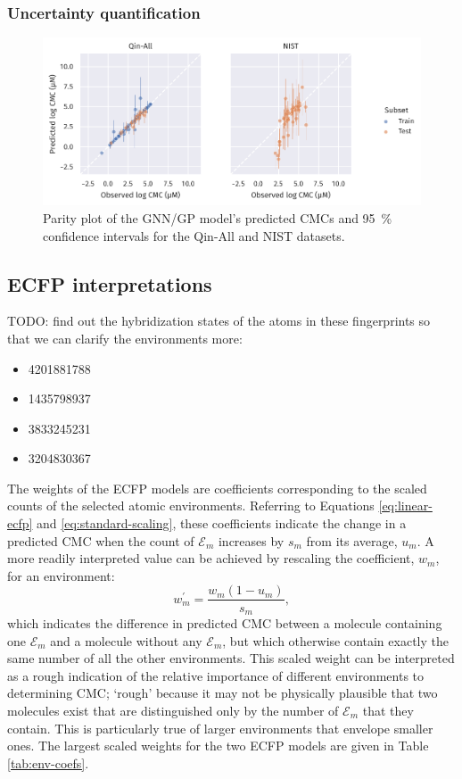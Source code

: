 \subsubsection{Uncertainty quantification}

\begin{figure}
    \centering
    \includegraphics[width=\textwidth]{images/uq-parity.pdf}
    \caption{Parity plot of the GNN/GP model's predicted CMCs and \SI{95}{\%}
    confidence intervals for the Qin-All and NIST datasets.}
\end{figure}

\subsection{ECFP interpretations}

TODO: find out the hybridization states of the atoms in these fingerprints
so that we can clarify the environments more:
\begin{itemize}
    \item 4201881788
    \item 1435798937
    \item 3833245231
    \item 3204830367
\end{itemize}

The weights of the ECFP models are coefficients corresponding to the scaled
counts of the selected atomic environments. Referring to Equations
\ref{eq:linear-ecfp} and \ref{eq:standard-scaling}, these coefficients indicate
the change in a predicted CMC when the count of $\mathcal{E}_m$ increases by
$s_m$ from its average, $u_m$. A more readily interpreted value can be achieved
by rescaling the coefficient, $w_m$, for an environment:
\begin{equation}
    w_m^\prime = \frac{w_m(1 - u_m)}{s_m},
\end{equation}
which indicates the difference in predicted CMC between a molecule containing
one $\mathcal{E}_m$ and a molecule without any $\mathcal{E}_m$, but which
otherwise contain exactly the same number of all the other environments. This
scaled weight can be interpreted as a rough indication of the relative
importance of different environments to determining CMC; `rough' because it may
not be physically plausible that two molecules exist that are distinguished only
by the number of $\mathcal{E}_m$ that they contain. This is particularly true of
larger environments that envelope smaller ones. The largest scaled weights for
the two ECFP models are given in Table \ref{tab:env-coefs}.

